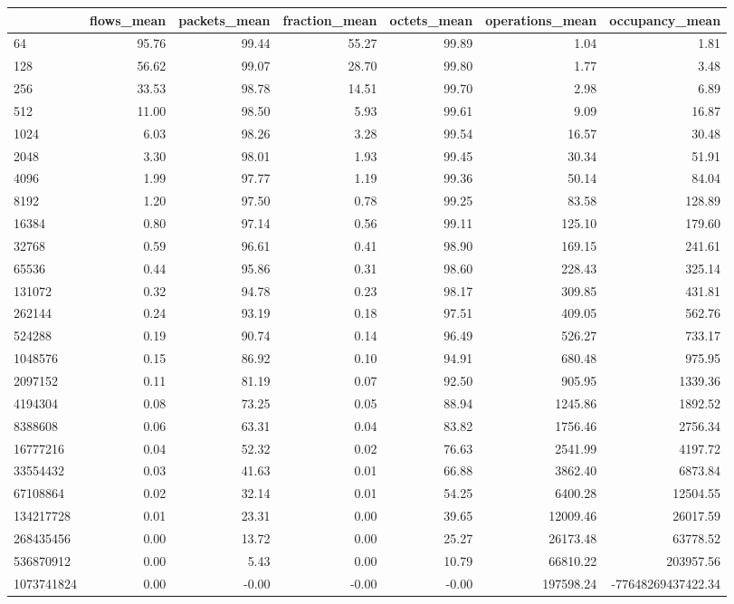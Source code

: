 \begin{tabular}{lrrrrrr}
\toprule
 & flows_mean & packets_mean & fraction_mean & octets_mean & operations_mean & occupancy_mean \\
\midrule
64 & 95.76 & 99.44 & 55.27 & 99.89 & 1.04 & 1.81 \\
128 & 56.62 & 99.07 & 28.70 & 99.80 & 1.77 & 3.48 \\
256 & 33.53 & 98.78 & 14.51 & 99.70 & 2.98 & 6.89 \\
512 & 11.00 & 98.50 & 5.93 & 99.61 & 9.09 & 16.87 \\
1024 & 6.03 & 98.26 & 3.28 & 99.54 & 16.57 & 30.48 \\
2048 & 3.30 & 98.01 & 1.93 & 99.45 & 30.34 & 51.91 \\
4096 & 1.99 & 97.77 & 1.19 & 99.36 & 50.14 & 84.04 \\
8192 & 1.20 & 97.50 & 0.78 & 99.25 & 83.58 & 128.89 \\
16384 & 0.80 & 97.14 & 0.56 & 99.11 & 125.10 & 179.60 \\
32768 & 0.59 & 96.61 & 0.41 & 98.90 & 169.15 & 241.61 \\
65536 & 0.44 & 95.86 & 0.31 & 98.60 & 228.43 & 325.14 \\
131072 & 0.32 & 94.78 & 0.23 & 98.17 & 309.85 & 431.81 \\
262144 & 0.24 & 93.19 & 0.18 & 97.51 & 409.05 & 562.76 \\
524288 & 0.19 & 90.74 & 0.14 & 96.49 & 526.27 & 733.17 \\
1048576 & 0.15 & 86.92 & 0.10 & 94.91 & 680.48 & 975.95 \\
2097152 & 0.11 & 81.19 & 0.07 & 92.50 & 905.95 & 1339.36 \\
4194304 & 0.08 & 73.25 & 0.05 & 88.94 & 1245.86 & 1892.52 \\
8388608 & 0.06 & 63.31 & 0.04 & 83.82 & 1756.46 & 2756.34 \\
16777216 & 0.04 & 52.32 & 0.02 & 76.63 & 2541.99 & 4197.72 \\
33554432 & 0.03 & 41.63 & 0.01 & 66.88 & 3862.40 & 6873.84 \\
67108864 & 0.02 & 32.14 & 0.01 & 54.25 & 6400.28 & 12504.55 \\
134217728 & 0.01 & 23.31 & 0.00 & 39.65 & 12009.46 & 26017.59 \\
268435456 & 0.00 & 13.72 & 0.00 & 25.27 & 26173.48 & 63778.52 \\
536870912 & 0.00 & 5.43 & 0.00 & 10.79 & 66810.22 & 203957.56 \\
1073741824 & 0.00 & -0.00 & -0.00 & -0.00 & 197598.24 & -77648269437422.34 \\
\bottomrule
\end{tabular}
